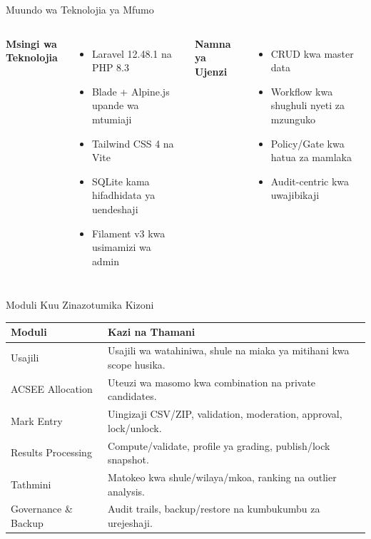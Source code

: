 \documentclass[aspectratio=169,11pt]{beamer}
\begin{document}
\begin{frame}{Muundo wa Teknolojia ya Mfumo}
\begin{columns}[T]
\textbf{Msingi wa Teknolojia}
\begin{itemize}
  \item Laravel 12.48.1 na PHP 8.3
  \item Blade + Alpine.js upande wa mtumiaji
  \item Tailwind CSS 4 na Vite
  \item SQLite kama hifadhidata ya uendeshaji
  \item Filament v3 kwa usimamizi wa admin
\end{itemize}

\textbf{Namna ya Ujenzi}
\begin{itemize}
  \item CRUD kwa master data
  \item Workflow kwa shughuli nyeti za mzunguko
  \item Policy/Gate kwa hatua za mamlaka
  \item Audit-centric kwa uwajibikaji
\end{itemize}
\end{columns}
\end{frame}

\begin{frame}{Moduli Kuu Zinazotumika Kizoni}
\small
\begin{tabularx}{\textwidth}{>{\RaggedRight\arraybackslash}p{3.1cm} X}
\toprule
\textbf{Moduli} & \textbf{Kazi na Thamani} \\
\midrule
Usajili & Usajili wa watahiniwa, shule na miaka ya mitihani kwa scope husika. \\
ACSEE Allocation & Uteuzi wa masomo kwa combination na private candidates. \\
Mark Entry & Uingizaji CSV/ZIP, validation, moderation, approval, lock/unlock. \\
Results Processing & Compute/validate, profile ya grading, publish/lock snapshot. \\
Tathmini & Matokeo kwa shule/wilaya/mkoa, ranking na outlier analysis. \\
Governance \& Backup & Audit trails, backup/restore na kumbukumbu za urejeshaji. \\
\bottomrule
\end{tabularx}
\end{frame}
\end{document}
